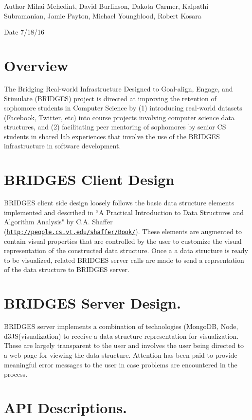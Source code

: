 \begin{DoxyAuthor}{Author}
Mihai Mehedint, David Burlinson, Dakota Carmer, Kalpathi Subramanian, Jamie Payton, Michael Youngblood, Robert Kosara 
\end{DoxyAuthor}
\begin{DoxyDate}{Date}
7/18/16
\end{DoxyDate}
\hypertarget{index_overview_sec}{}\section{Overview}\label{index_overview_sec}
The Bridging Real-\/world Infrastructure Designed to Goal-\/align, Engage, and Stimulate (B\+R\+I\+D\+G\+E\+S) project is directed at improving the retention of sophomore students in Computer Science by (1) introducing real-\/world datasets (Facebook, Twitter, etc) into course projects involving computer science data structures, and (2) facilitating peer mentoring of sophomores by senior C\+S students in shared lab experiences that involve the use of the B\+R\+I\+D\+G\+E\+S infrastructure in software development. \hypertarget{index_br_client}{}\section{B\+R\+I\+D\+G\+E\+S Client Design}\label{index_br_client}
B\+R\+I\+D\+G\+E\+S client side design loosely follows the basic data structure elements implemented and described in ``\+A Practical Introduction to Data Structures and Algorithm Analysis" by C.\+A. Shaffer (\href{http://people.cs.vt.edu/shaffer/Book/}{\tt http\+://people.\+cs.\+vt.\+edu/shaffer/\+Book/}). These elements are augmented to contain visual properties that are controlled by the user to customize the visual representation of the constructed data structure. Once a a data structure is ready to be visualized, related B\+R\+I\+D\+G\+E\+S server calls are made to send a reprsentation of the data structure to B\+R\+I\+D\+G\+E\+S server. \hypertarget{index_br_server}{}\section{B\+R\+I\+D\+G\+E\+S Server Design.}\label{index_br_server}
B\+R\+I\+D\+G\+E\+S server implements a combination of technologies (Mongo\+D\+B, Node, d3\+J\+S(visualization) to receive a data structure representation for visualization. These are largely transparent to the user and involves the user being directed to a web page for viewing the data structure. Attention has been paid to provide meaningful error messages to the user in case problems are encountered in the process. \hypertarget{index_api_sec}{}\section{A\+P\+I Descriptions.}\label{index_api_sec}
